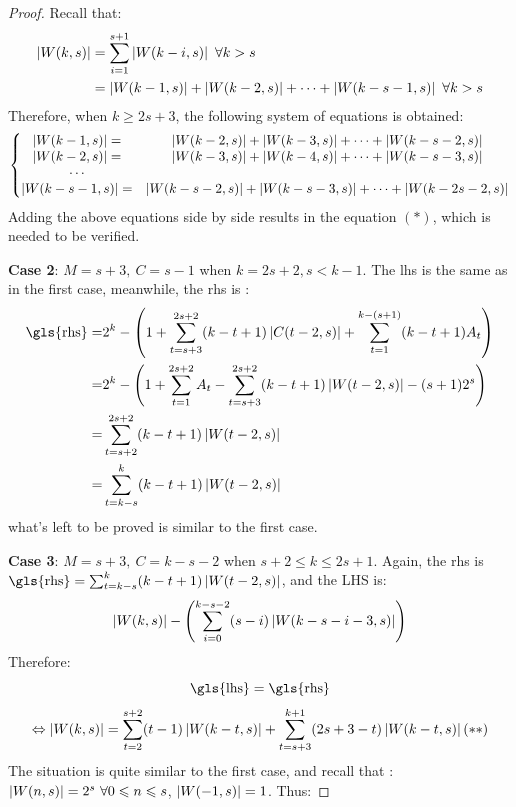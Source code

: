 \begin{proof}
    Recall that:
    \begin{align*}
        \left \lvert W(k,s) \right \rvert &= \sum_{i=1}^{s+1}\left \lvert  W(k-i,s) \right \rvert\ \forall k>s\\
        &=\left \lvert  W(k-1,s) \right \rvert+\left \lvert  W(k-2,s) \right \rvert + \cdots + \left \lvert  W(k-s-1,s) \right \rvert\ \forall k>s
    \end{align*}
    Therefore, when $k\geq2s+3$, the following system of equations is obtained:
    \[\left\{\begin{matrix}
        \left \lvert  W(k-1,s) \right \rvert = &\left \lvert  W(k-2,s) \right \rvert + \left \lvert  W(k-3,s) \right \rvert+\cdots + \left \lvert  W(k-s-2,s) \right \rvert \\
        \left \lvert  W(k-2,s) \right \rvert = &\left \lvert  W(k-3,s) \right \rvert + \left \lvert  W(k-4,s) \right \rvert+\cdots + \left \lvert  W(k-s-3,s) \right \rvert \\
        \cdots \\
        \left \lvert  W(k-s-1,s) \right \rvert = &\left \lvert  W(k-s-2,s) \right \rvert + \left \lvert  W(k-s-3,s) \right \rvert+\cdots + \left \lvert  W(k-2s-2,s) \right \rvert
    \end{matrix}\right.\]
    Adding the above equations side by side results in the equation $(*)$, which is needed to be verified.
    
    \textbf{Case 2}: $M=s+3,\ C=s-1$ when $k=2s+2,s<k-1$. 
    The \gls{lhs} is the same as in the first case, meanwhile, the \gls{rhs} is :
    \begin{align*}
        \mathrm{\gls{rhs}} = &2^{k}-\left(1+\sum_{t=s+3}^{2s+2}(k-t+1)\card{ C(t-2,s)}+\sum_{t=1}^{k-(s+1)}(k-t+1)A_{t}\right) \\
        =&2^{k}-\left(1+\sum_{t=1}^{2s+2}A_{t}-\sum_{t=s+3}^{2s+2}(k-t+1)\card{ W(t-2,s)}-(s+1)2^{s}\right)\\
        =&\sum_{t=s+2}^{2s+2}(k-t+1)\card{ W(t-2,s)}\\
        =&\sum_{t=k-s}^{k}(k-t+1)\card{ W(t-2,s)}
    \end{align*}
    what's left to be proved is similar to the first case.
    
    \textbf{Case 3}: $M=s+3,\ C=k-s-2$ when $s+2\leq k\leq 2s+1$.
    Again, the \gls{rhs} is $\mathrm{\gls{rhs}} = \sum_{t=k-s}^{k}(k-t+1)\card{ W(t-2,s)}$, and the LHS is:
    \[\left \lvert  W(k,s) \right \rvert - \left(\sum_{i=0}^{k-s-2}(s-i)\left \lvert  W(k-s-i-3,s) \right \rvert \right)\]
    Therefore:
    \[\mathrm{\gls{lhs}} = \mathrm{\gls{rhs}}\]
    \[\Leftrightarrow \left \lvert  W(k,s) \right \rvert = \sum_{t=2}^{s+2}(t-1)\left \lvert  W(k-t,s) \right \rvert + \sum_{t=s+3}^{k+1}(2s+3-t)\left \lvert  W(k-t,s) \right \rvert (**)\]
    The situation is quite similar to the first case, and recall that : $\left \lvert  W(n,s)  \right \rvert = 2^{s}\ \forall 0\leqslant n\leqslant s$, $\left \lvert  W(-1,s) \right \rvert = 1$. Thus:
    

\end{proof}
